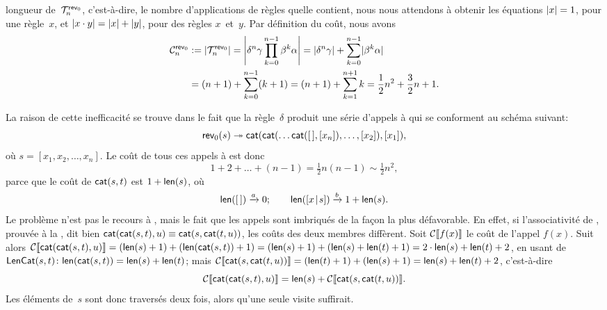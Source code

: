 longueur de~\(\T{\fun{rev}_0}{n}\), c'est-à-dire, le nombre
d'applications de règles quelle contient, nous nous attendons à
obtenir les équations \(\len{x} = 1\), pour une règle~\(x\), et
\(\len{x \cdot y} = \len{x} + \len{y}\), pour des règles
\(x\)~et~\(y\). Par définition du coût, nous
avons
\begin{align*}
\C{\fun{rev}_0}{n}
  &:= \len{\T{\fun{rev}_0}{n}}
    = \left\lvert\delta^n\gamma 
        \prod_{k=0}^{n-1}{\beta^k\alpha}\right\lvert
    = \len{\delta^n\gamma} + \sum_{k=0}^{n-1}\len{\beta^k\alpha}\\
   &= (n+1) + \sum_{k=0}^{n-1}(k+1) = (n+1) + \sum_{k=1}^{n+1}k
    = \frac{1}{2}n^2 + \frac{3}{2}n + 1.
\end{align*}

La raison de cette inefficacité se trouve dans le fait que la
règle~\(\delta\) produit une série d'appels à
 qui se conforment au schéma
suivant:
\begin{equation}
\fun{rev}_0(s) \twoheadrightarrow \fun{cat}(\fun{cat}(\dots
\fun{cat}(\el, [x_n]), \dots, [x_2]), [x_1]),
\label{eq_rev0}
\end{equation}
où \(s = [x_1, x_2, \dots, x_n]\). Le coût de tous ces appels à
 est donc
\begin{equation*}
1 + 2 + \dots + (n-1) = \tfrac{1}{2}n(n-1) \sim
\tfrac{1}{2}n^2,
\end{equation*}
parce que le coût de \(\fun{cat}(s,t)\) est \(1
+ \fun{len}(s)\), où
\begin{equation}
\fun{len}(\el) \xrightarrow{\smash{a}} 0;
\qquad
\fun{len}(\cons{x}{s}) \xrightarrow{\smash{b}} 1 + \fun{len}(s).
\label{eq_len}
\end{equation}
Le problème n'est pas le recours à , mais le fait que les
appels sont imbriqués de la façon la plus défavorable. En effet, si
l'associativité de
, prouvée à la
, dit bien \(\fun{cat}(\fun{cat}(s,t),u)
\equiv \fun{cat}(s,\fun{cat}(t,u))\), les coûts des deux membres
diffèrent. Soit \(\Call{f(x)}\) le coût de l'appel \(f(x)\). Suit
alors \(\Call{\fun{cat}(\fun{cat}(s,t),u)} = (\fun{len}(s) + 1) +
(\fun{len}(\fun{cat}(s,t)) + 1) = (\fun{len}(s) + 1) + (\fun{len}(s) +
\fun{len}(t) + 1) = 2 \cdot \fun{len}(s) + \fun{len}(t) + 2\), en
usant de \(\pred{LenCat}{s,t} \colon \fun{len}(\fun{cat}(s,t)) =
\fun{len}(s) + \fun{len}(t)\); mais
\(\Call{\fun{cat}(s,\fun{cat}(t,u))} = (\fun{len}(t) + 1) +
(\fun{len}(s) + 1) = \fun{len}(s) + \fun{len}(t) + 2\), c'est-à-dire
\begin{equation}
\Call{\fun{cat}(\fun{cat}(s,t),u)} = \fun{len}(s) +
\Call{\fun{cat}(s,\fun{cat}(t,u))}.
\label{ineq_cat_assoc}
\end{equation}
Les éléments de~\(s\) sont donc traversés deux fois, alors qu'une
seule visite suffirait.

